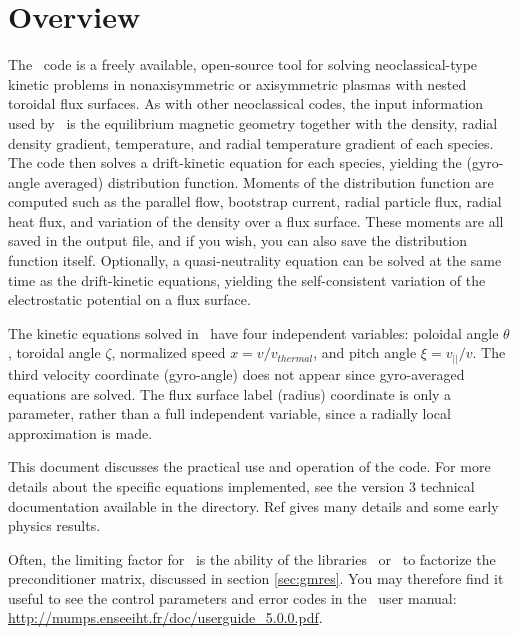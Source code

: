 \chapter{Overview}


The \sfincs~code is a freely available, open-source tool for solving neoclassical-type kinetic problems in nonaxisymmetric or axisymmetric plasmas
with nested toroidal flux surfaces.
As with other neoclassical codes, the input information used by \sfincs~is the equilibrium magnetic geometry together with the density, radial density gradient, temperature,
and radial temperature gradient of each species.  The code then solves a drift-kinetic equation for each species,
yielding the (gyro-angle averaged) distribution function.  Moments of the distribution function are computed such as the parallel
flow, bootstrap current, radial particle flux, radial heat flux, and variation of the density over a flux surface.  
These moments are all saved in the output file, and if you wish, you can also save the distribution function itself.
Optionally, a quasi-neutrality
equation can be solved at the same time as the drift-kinetic equations, yielding the self-consistent variation of the electrostatic potential on a flux surface.

The kinetic equations solved in \sfincs~have four independent variables: poloidal angle $\theta$, toroidal angle $\zeta$,
normalized speed $x = v / v_{thermal}$, and pitch angle $\xi = v_{||}/v$.  The third velocity coordinate (gyro-angle) does not appear
since gyro-averaged equations are solved.  The flux surface label (radius) coordinate is only a parameter, rather than a full independent variable,
since a radially local approximation is made.

This document discusses the practical use and operation of the code.  For more details about the specific equations implemented,
see the version 3 technical documentation available in the  directory.
Ref \cite{sfincsPaper} gives many details and some early physics results.

Often, the limiting factor for \sfincs~is the ability of the libraries \mumps~or \superludist~to factorize the preconditioner matrix, discussed in section \ref{sec:gmres}.
You may therefore find it useful to see the control parameters and error codes in the \mumps~user manual:
\url{http://mumps.enseeiht.fr/doc/userguide_5.0.0.pdf}.


